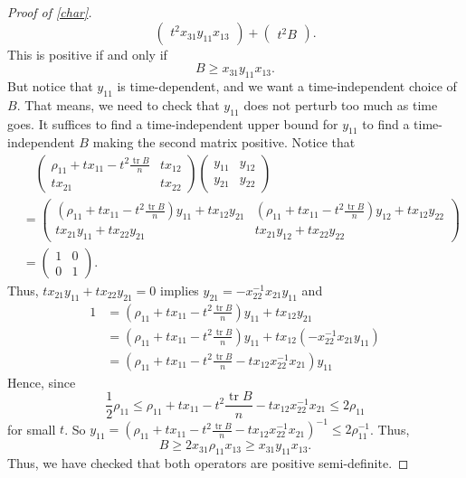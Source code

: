 \documentclass[11pt,reqno]{amsart}
\theoremstyle{definition}
\newcommand{\lpara}{\left(}
\newcommand{\rpara}{\right)}
\newcommand{\inv}{^{-1}}
\DeclareMathOperator{\tr}{tr}
\begin{document}
\begin{proof}[Proof of \cref{char}]
$$\begin{pmatrix}
        t^2x_{31}y_{11}x_{13}
    \end{pmatrix}+\begin{pmatrix}
        t^2B
    \end{pmatrix}.$$
    This is positive if and only if $$B\geq x_{31}y_{11}x_{13}.$$
    But notice that $y_{11}$ is time-dependent, and we want a time-independent choice of $B$. That means, we need to check that $y_{11}$ does not perturb too much as time goes.
    It suffices to find a time-independent upper bound for $y_{11}$ to find a time-independent $B$ making the second matrix positive.
    Notice that 
    \begin{equation*}
    \begin{aligned}
        &\quad \begin{pmatrix}
            \rho_{11}+tx_{11}-t^2\frac{\tr B}{n} & tx_{12}\\
            tx_{21} & tx_{22} 
        \end{pmatrix}\begin{pmatrix}
            y_{11} & y_{12}\\
            y_{21} & y_{22}
        \end{pmatrix}\\
        &=\begin{pmatrix}
            \lpara \rho_{11}+tx_{11}-t^2\frac{\tr B}{n}\rpara y_{11}+tx_{12}y_{21} & \lpara \rho_{11}+tx_{11}-t^2\frac{\tr B}{n}\rpara y_{12}+tx_{12}y_{22}\\
            tx_{21}y_{11}+tx_{22}y_{21} & tx_{21}y_{12}+tx_{22}y_{22}
        \end{pmatrix}\\
        &=\begin{pmatrix}
            1 & 0\\
            0 & 1
        \end{pmatrix}.
    \end{aligned}
    \end{equation*}
    Thus, $tx_{21}y_{11}+tx_{22}y_{21}=0$ implies $y_{21}=-x_{22}\inv x_{21}y_{11}$
    and 
    \begin{equation*}
    \begin{aligned}
        1 &= \lpara \rho_{11}+tx_{11}-t^2\frac{\tr B}{n}\rpara y_{11}+tx_{12}y_{21}\\
        &= \lpara \rho_{11}+tx_{11}-t^2\frac{\tr B}{n}\rpara y_{11}+tx_{12}\lpara -x_{22}\inv x_{21}y_{11}\rpara\\
        &= \lpara \rho_{11}+tx_{11}-t^2\frac{\tr B}{n}-tx_{12}x_{22}\inv x_{21}\rpara y_{11}
    \end{aligned}
    \end{equation*}
    Hence, since $$\frac{1}{2}\rho_{11}\leq \rho_{11}+tx_{11}-t^2\frac{\tr B}{n}-tx_{12}x_{22}\inv x_{21}\leq 2\rho_{11}$$ for small $t$.
    So $y_{11}= \lpara \rho_{11}+tx_{11}-t^2\frac{\tr B}{n}-tx_{12}x_{22}\inv x_{21}\rpara\inv\leq 2\rho_{11}\inv$. Thus, 
    $$B\geq 2x_{31}\rho_{11}x_{13}\geq x_{31}y_{11}x_{13}.$$
    Thus, we have checked that both operators are positive semi-definite. 
\end{proof}
\end{document}
